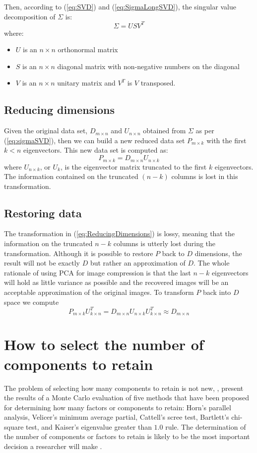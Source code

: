 \documentclass{article} %
\begin{document}
 Then, according to (\ref{eq:SVD}) and (\ref{eq:SigmaLongSVD}), the singular value decomposition of $\Sigma$ is: 
\begin{equation}\label{eq:sigmaSVD}
\Sigma = US V^T
\end{equation}
where:
\begin{itemize}
\item $U$ is an $n\times n$ orthonormal matrix
\item $S$ is an $n\times n$ diagonal matrix with non-negative numbers on the diagonal
\item $V$ is an $n\times n$ unitary matrix and $V^T$ is $V$ transposed.
\end{itemize}

\subsection{Reducing dimensions}
Given the original data set, $D_{m\times n}$ and $U_{n\times n}$ obtained from $\Sigma$ as per (\ref{eq:sigmaSVD}), then we can build a new reduced data set $P_{m\times k}$ with the first $k<n$ eigenvectors. This new data set is computed as:
\begin{equation}\label{eq:ReducingDimensions}
P_{m\times k} = D_{m\times n} U_{n\times k}
\end{equation}
where $U_{n\times k}$, or $U_k$, is the eigenvector matrix truncated to the first $k$ eigenvectors. The information contained on the truncated $(n-k)$ columns is lost in this transformation.
\subsection{Restoring data}
The transformation in (\ref{eq:ReducingDimensions}) is lossy, meaning that the information on the truncated $n-k$ columns is utterly lost during the transformation. Although it is possible to restore $P$ back to $D$ dimensions, the result will not be exactly $D$ but rather an approximation of $D$. The whole rationale of using PCA for image compression is that the last $n-k$ eigenvectors will hold as little variance as possible and the recovered images will be an acceptable approximation of the original images.
To transform $P$ back into $D$ space we compute \[P_{m\times k}U_{k\times n}^T = D_{m\times n}U_{n\times k}U_{k\times n}^T \approx D_{m\times n}\]
\section{How to select the number of components to retain}
The problem of selecting how many components to retain is not new, \citet{zwick1986comparison}, present the results of a Monte Carlo evaluation of five methods that have been proposed for determining how many factors or components to retain: Horn's parallel analysis, Velicer's minimum average partial, Cattell's scree test, Bartlett's chi-square test, and Kaiser's eigenvalue greater than $1.0$ rule. 
The determination of the number of components or factors to retain is likely to be the most important decision a researcher will make \citep{zwick1986comparison}.\par
\end{document}
